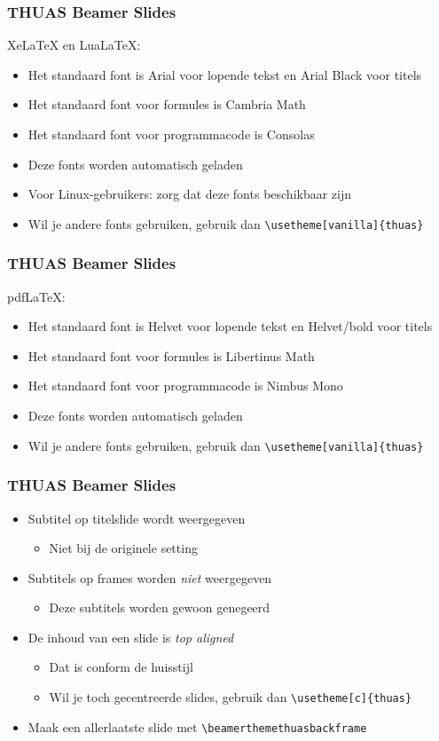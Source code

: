 \documentclass[fleqn,aspectratio=169,dutch,10pt]{beamer}
\begin{document}
\begin{frame}[fragile]
\frametitle{THUAS Beamer Slides}
Xe\LaTeX{} en Lua\LaTeX:
\begin{itemize}
\item Het standaard font is Arial voor lopende tekst en Arial Black voor titels
\item Het standaard font voor formules is Cambria Math
\item Het standaard font voor programmacode is Consolas
\item Deze fonts worden automatisch geladen
\item Voor Linux-gebruikers: zorg dat deze fonts beschikbaar zijn
\item Wil je andere fonts gebruiken, gebruik dan \lstinline|\usetheme[vanilla]{thuas}|
\end{itemize}
\end{frame}


\begin{frame}[fragile]
\frametitle{THUAS Beamer Slides}
pdf\LaTeX{}:
\begin{itemize}
\item Het standaard font is Helvet voor lopende tekst en Helvet/bold voor titels
\item Het standaard font voor formules is Libertinus Math
\item Het standaard font voor programmacode is Nimbus Mono
\item Deze fonts worden automatisch geladen
\item Wil je andere fonts gebruiken, gebruik dan \lstinline|\usetheme[vanilla]{thuas}|
\end{itemize}
\end{frame}


\begin{frame}[fragile]
\frametitle{THUAS Beamer Slides}
\begin{itemize}
\item Subtitel op titelslide wordt weergegeven
\begin{itemize}
\item Niet bij de originele setting
\end{itemize}
\item Subtitels op frames worden \emph{niet} weergegeven
\begin{itemize}
\item Deze subtitels worden gewoon genegeerd
\end{itemize}
\item De inhoud van een slide is \emph{top aligned}
\begin{itemize}
\item Dat is conform de huisstijl
\item Wil je toch gecentreerde slides, gebruik dan \lstinline|\usetheme[c]{thuas}|
\end{itemize}
\item Maak een allerlaatste slide met \lstinline|\beamerthemethuasbackframe|
\end{itemize}
\end{frame}
\end{document}
